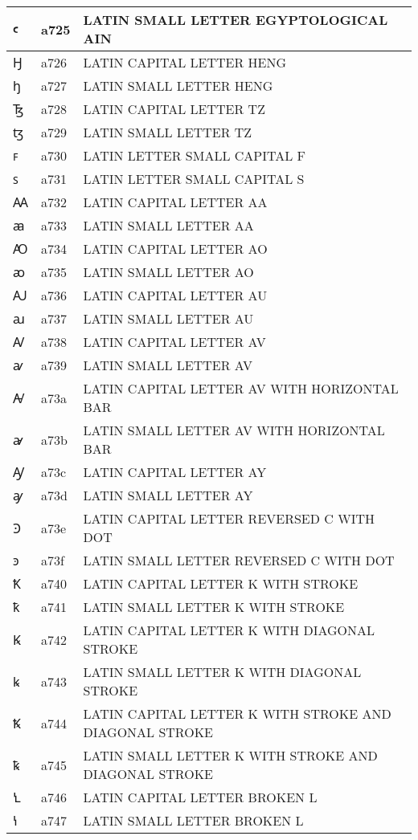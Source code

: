 \documentclass[12pt,letterpaper,openany]{book}
\begin{document}
\begin{center}
\begin{supertabular}{|m{0.25in}|m{0.5in}|m{4in}|}
ꜥ & a725 & LATIN SMALL LETTER EGYPTOLOGICAL AIN\\\hline
Ꜧ & a726 & LATIN CAPITAL LETTER HENG\\\hline
ꜧ & a727 & LATIN SMALL LETTER HENG\\\hline
Ꜩ & a728 & LATIN CAPITAL LETTER TZ\\\hline
ꜩ & a729 & LATIN SMALL LETTER TZ\\\hline
ꜰ & a730 & LATIN LETTER SMALL CAPITAL F\\\hline
ꜱ & a731 & LATIN LETTER SMALL CAPITAL S\\\hline
Ꜳ & a732 & LATIN CAPITAL LETTER AA\\\hline
ꜳ & a733 & LATIN SMALL LETTER AA\\\hline
Ꜵ & a734 & LATIN CAPITAL LETTER AO\\\hline
ꜵ & a735 & LATIN SMALL LETTER AO\\\hline
Ꜷ & a736 & LATIN CAPITAL LETTER AU\\\hline
ꜷ & a737 & LATIN SMALL LETTER AU\\\hline
Ꜹ & a738 & LATIN CAPITAL LETTER AV\\\hline
ꜹ & a739 & LATIN SMALL LETTER AV\\\hline
Ꜻ & a73a & LATIN CAPITAL LETTER AV WITH HORIZONTAL BAR\\\hline
ꜻ & a73b & LATIN SMALL LETTER AV WITH HORIZONTAL BAR\\\hline
Ꜽ & a73c & LATIN CAPITAL LETTER AY\\\hline
ꜽ & a73d & LATIN SMALL LETTER AY\\\hline
Ꜿ & a73e & LATIN CAPITAL LETTER REVERSED C WITH DOT\\\hline
ꜿ & a73f & LATIN SMALL LETTER REVERSED C WITH DOT\\\hline
Ꝁ & a740 & LATIN CAPITAL LETTER K WITH STROKE\\\hline
ꝁ & a741 & LATIN SMALL LETTER K WITH STROKE\\\hline
Ꝃ & a742 & LATIN CAPITAL LETTER K WITH DIAGONAL STROKE\\\hline
ꝃ & a743 & LATIN SMALL LETTER K WITH DIAGONAL STROKE\\\hline
Ꝅ & a744 & LATIN CAPITAL LETTER K WITH STROKE AND DIAGONAL STROKE\\\hline
ꝅ & a745 & LATIN SMALL LETTER K WITH STROKE AND DIAGONAL STROKE\\\hline
Ꝇ & a746 & LATIN CAPITAL LETTER BROKEN L\\\hline
ꝇ & a747 & LATIN SMALL LETTER BROKEN L\\\hline

\end{supertabular}
\end{center}
\end{document}
